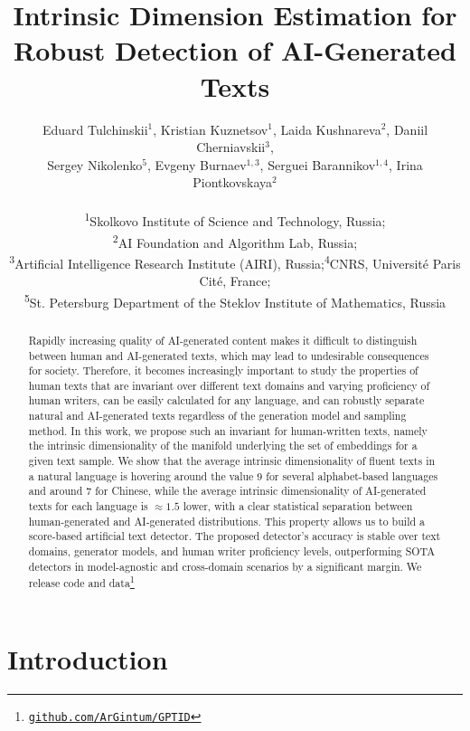 \documentclass{article}
\title{Intrinsic Dimension Estimation for Robust Detection of AI-Generated Texts}
\author{
\begin{tabular}{c}
Eduard Tulchinskii$^{1}$, Kristian Kuznetsov$^{1}$, Laida Kushnareva$^{2}$, Daniil Cherniavskii$^3$, \\
 Sergey Nikolenko$^{5}$, Evgeny Burnaev$^{1,3}$, Serguei Barannikov$^{1,4}$, Irina Piontkovskaya$^{2}$
\end{tabular}
\\
  \textsuperscript{1}Skolkovo Institute of Science and Technology, Russia;
  \\ \textsuperscript{2}AI Foundation and Algorithm Lab, Russia;  
  \\ \textsuperscript{3}Artificial Intelligence Research Institute (AIRI), Russia;\textsuperscript{4}CNRS, Université Paris Cité, France;
\\\textsuperscript{5}St. Petersburg Department of the Steklov Institute of Mathematics, Russia \\
}
\begin{document}
\maketitle


\begin{abstract}
Rapidly increasing quality of AI-generated content makes it difficult to distinguish between human and AI-generated texts, which may lead to undesirable consequences for society. Therefore, it becomes increasingly important to study the properties of human texts that are invariant over different text domains and varying proficiency of human writers, can be easily calculated for any language, and can robustly separate natural and AI-generated texts regardless of the generation model and sampling method. In this work, we propose such an invariant for human-written texts, namely the intrinsic dimensionality of the manifold underlying the set of embeddings for a given text sample. We show that the average intrinsic dimensionality of fluent texts in a natural language is hovering around the value $9$ for several alphabet-based languages and around $7$ for Chinese, while the average intrinsic dimensionality of AI-generated texts for each language is $\approx 1.5$ lower, with a clear statistical separation between human-generated and AI-generated distributions. This property allows us to build a score-based artificial text detector. The proposed detector's accuracy is stable over text domains, generator models, and human writer proficiency levels, outperforming SOTA detectors in model-agnostic and cross-domain scenarios by a significant margin. We release code and data\footnote{\href{https://github.com/ArGintum/GPTID}{\texttt{github.com/ArGintum/GPTID}}}
\end{abstract}

\section{Introduction}
\end{document}
